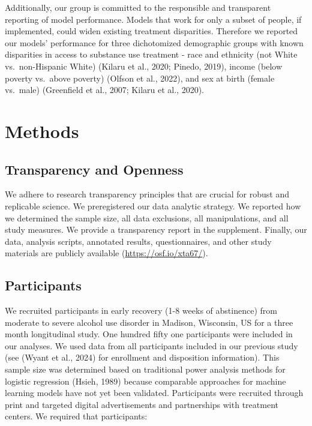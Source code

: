 \documentclass[
]{agujournal2019}
\begin{document}
Additionally, our group is committed to the responsible and transparent
reporting of model performance. Models that work for only a subset of
people, if implemented, could widen existing treatment disparities.
Therefore we reported our models' performance for three dichotomized
demographic groups with known disparities in access to substance use
treatment - race and ethnicity (not White vs.~non-Hispanic White)
(Kilaru et al., 2020; Pinedo, 2019), income (below poverty vs.~above
poverty) (Olfson et al., 2022), and sex at birth (female vs.~male)
(Greenfield et al., 2007; Kilaru et al., 2020).

\section{Methods}\label{methods}

\subsection{Transparency and Openness}\label{transparency-and-openness}

We adhere to research transparency principles that are crucial for
robust and replicable science. We preregistered our data analytic
strategy. We reported how we determined the sample size, all data
exclusions, all manipulations, and all study measures. We provide a
transparency report in the supplement. Finally, our data, analysis
scripts, annotated results, questionnaires, and other study materials
are publicly available (\url{https://osf.io/xta67/}).

\subsection{Participants}\label{participants}

We recruited participants in early recovery (1-8 weeks of abstinence)
from moderate to severe alcohol use disorder in Madison, Wisconsin, US
for a three month longitudinal study. One hundred fifty one participants
were included in our analyses. We used data from all participants
included in our previous study (see (Wyant et al., 2024) for enrollment
and disposition information). This sample size was determined based on
traditional power analysis methods for logistic regression (Hsieh, 1989)
because comparable approaches for machine learning models have not yet
been validated. Participants were recruited through print and targeted
digital advertisements and partnerships with treatment centers. We
required that participants:
\end{document}
